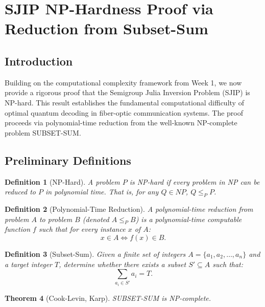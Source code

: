 \documentclass[12pt]{article}
\newtheorem{theorem}{Theorem}[section]
\newtheorem{definition}[theorem]{Definition}
\begin{document}
\section{SJIP NP-Hardness Proof via Reduction from Subset-Sum}
\subsection{Introduction}
Building on the computational complexity framework from Week 1, we now provide a rigorous proof that the Semigroup Julia Inversion Problem (SJIP) is NP-hard. This result establishes the fundamental computational difficulty of optimal quantum decoding in fiber-optic communication systems. The proof proceeds via polynomial-time reduction from the well-known NP-complete problem SUBSET-SUM.

\subsection{Preliminary Definitions}
\begin{definition}[NP-Hard]
A problem $P$ is NP-hard if every problem in NP can be reduced to $P$ in polynomial time. That is, for any $Q \in NP$, $Q \leq_{P} P$.
\end{definition}

\begin{definition}[Polynomial-Time Reduction]
A polynomial-time reduction from problem $A$ to problem $B$ (denoted $A \leq_{P} B$) is a polynomial-time computable function $f$ such that for every instance $x$ of $A$:
\[
x\in A\iff f(x)\in B.
\]
\end{definition}

\begin{definition}[Subset-Sum]
Given a finite set of integers $A = \{a_{1}, a_{2}, \ldots , a_{n}\}$ and a target integer $T$, determine whether there exists a subset $S' \subseteq A$ such that:
\[
\sum_{a_i \in S'} a_i = T.
\]
\end{definition}

\begin{theorem}[Cook-Levin, Karp]
SUBSET-SUM is NP-complete.
\end{theorem}
\end{document}
